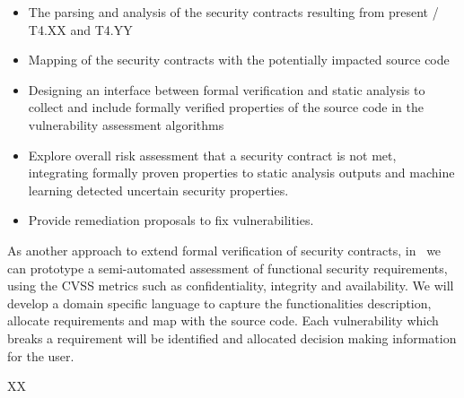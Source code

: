 \begin{Workpackage}{\thewpno}
\begin{Task}
\begin{itemize}
\item The parsing and analysis of the security contracts resulting from present \theWP / T4.XX and T4.YY
    \item Mapping of the security contracts with the potentially impacted source code
    \item Designing an interface between formal verification and static analysis to collect and include formally verified properties of the source code in the vulnerability assessment algorithms
    \item Explore overall risk assessment that a security contract is not met, integrating formally proven properties to static analysis outputs and machine learning detected uncertain security properties.
    \item Provide remediation proposals to fix vulnerabilities.
\end{itemize}

\end{Task}


\begin{Task}

\TaskResults{%
}
\TaskHeader{}

As another approach to extend formal verification of security contracts, in \theTask\ we can prototype a semi-automated assessment of functional security requirements, using the CVSS metrics such as confidentiality, integrity and availability.
We will develop a domain specific language to capture the functionalities description, allocate requirements and map with the source code. Each vulnerability which breaks a requirement will be identified and allocated decision making information for the user.
\end{Task}


\begin{WPDeliverables}
  \begin{compactitem}
    \item XX
\end{compactitem}
\end{WPDeliverables}
\end{Workpackage}
